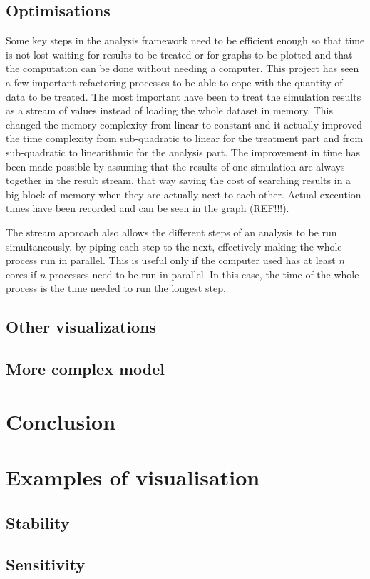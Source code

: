 \documentclass[a4paper,12pt]{report}
\begin{document}
\section{Optimisations}
Some key steps in the analysis framework need to be efficient enough so that time is not lost waiting for results to be treated or for graphs to be plotted and that the computation can be done without needing a computer.
This project has seen a few important refactoring processes to be able to cope with the quantity of data to be treated. The most important have been to treat the simulation results as a stream of values instead of loading the whole dataset in memory. This changed the memory complexity from linear to constant and it actually improved the time complexity from sub-quadratic to linear for the treatment part and from sub-quadratic to linearithmic for the analysis part. The improvement in time has been made possible by assuming that the results of one simulation are always together in the result stream, that way saving the cost of searching results in a big block of memory when they are actually next to each other.
Actual execution times have been recorded and can be seen in the graph (REF!!!).\

The stream approach also allows the different steps of an analysis to be run simultaneously, by piping each step to the next, effectively making the whole process run in parallel. This is useful only if the computer used has at least $n$ cores if $n$ processes need to be run in parallel. In this case, the time of the whole process is the time needed to run the longest step.


\section{Other visualizations}
\section{More complex model}


\chapter*{Conclusion}




\appendix
{}
\chapter{Examples of visualisation}

\section{Stability}
\section{Sensitivity}

\end{document}

